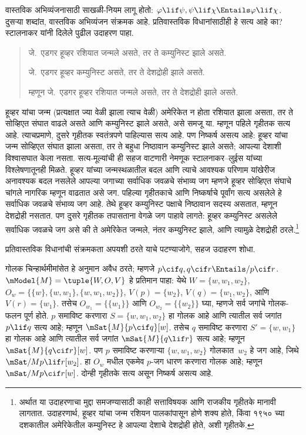 वास्तविक अभिव्यंजनासाठी
साखळी-नियम लागू होतो:
$\varphi \lif \psi, \psi
\lif \chi \Entails \varphi \lif \chi$.
दुसऱ्या शब्दांत,
वास्तविक अभिव्यंजन
संक्रमक आहे.
प्रतिवास्तविक विधानांसाठीही
हे सत्य आहे का?
स्टालनाकर यांनी दिलेले
पुढील उदाहरण पाहा.
\begin{quote}
  जे.~एडगर हूव्हर रशियात
  जन्मले असते, तर ते
  कम्युनिस्ट झाले असते.

  जे.~एडगर हूव्हर कम्युनिस्ट
  असते, तर ते देशद्रोही
  झाले असते.

  म्हणून जे.~एडगर हूव्हर
  रशियात जन्मले असते,
  तर ते देशद्रोही
  झाले असते.
\end{quote}
हूव्हर यांचा जन्म
(प्रत्यक्षात ज्या वेळी झाला
त्याच वेळी) अमेरिकेत
न होता रशियात झाला
असता, तर ते
सोव्हिएत संघात वाढले
असते आणि कम्युनिस्ट
झाले असते, असे
समजू या. म्हणून
पहिले गृहीतक सत्य
आहे. त्याचप्रमाणे,
दुसरे गृहीतक
स्वतंत्रपणे पाहिल्यास
सत्य आहे. पण
निष्कर्ष असत्य आहे:
हूव्हर यांचा जन्म
सोव्हिएत संघात
झाला असता, तर
ते बहुधा निष्ठावान
कम्युनिस्ट झाले
असते; आपल्या
देशाशी विश्वासघात
केला नसता.
सत्य-मूल्यांची ही
सहज वाटणारी
नेमणूक स्टालनाकर--लुईस
यांच्या विश्लेषणातूनही
मिळते. हूव्हर यांच्या
जन्मस्थळातील बदल आणि त्याचे आवश्यक परिणाम
यांखेरीज अनावश्यक बदल नसलेले आपल्या जगाच्या
सर्वाधिक जवळचे
संभाव्य जग म्हणजे
हूव्हर सोव्हिएत
संघाचे चांगले नागरिक
म्हणून वाढतात
असे जग. पहिल्या
गृहीतकाचे आणि
निष्कर्षाचे पूर्वांग
सत्य असलेले हे
सर्वाधिक जवळचे
संभाव्य जग आहे.
तेथे हूव्हर
कम्युनिस्ट पक्षाचे
निष्ठावान सदस्य
असतात, म्हणून
देशद्रोही नसतात.
पण दुसरे गृहीतक
तपासताना वेगळे
जग पाहावे लागते:
हूव्हर कम्युनिस्ट
असलेले सर्वाधिक
जवळचे जग असे
की ते अमेरिकेत
जन्मले, नंतर
कम्युनिस्ट झाले,
आणि त्यामुळे
देशद्रोही ठरले.\footnote{
  अर्थात या उदाहरणाचा
  मुद्दा समजण्यासाठी
  काही सत्ताविषयक
  आणि राजकीय
  गृहीतके मानावी
  लागतात. उदाहरणार्थ,
  हूव्हर यांचा जन्म
  रशियन पालकांपासून
  होणे शक्य होते,
  किंवा १९५० च्या
  दशकातील अमेरिकेतील
  कम्युनिस्ट हे आपल्या
  देशाचे देशद्रोही होते,
  अशी गृहीतके.}

\begin{prob}
  प्रतिवास्तविक विधानांची
  संक्रमकता अपयशी
  ठरते याचे पटण्याजोगे,
  सहज उदाहरण शोधा.
\end{prob}

\begin{ex}\label{cnt:min:tra:ex:trans-counterex}
  गोलक चिन्हार्थमीमांसेत हे
  अनुमान अवैध ठरते;
  म्हणजे
  $p \cif q, q \cif r
  \Entails/ p \cif r$.
  $\mModel{M} = \tuple{W, O, V}$
  हे प्रतिमान पाहा: येथे
  $W = \{w, w_1, w_2\}$,
  $O_w = \{\{w\}, \{w,
  w_1\}, \{w, w_1, w_2\}\}$,
  $V(p) = \{w_2\}$,
  $V(q) = \{w_1, w_2\}$,
  आणि $V(r) = \{w_1\}$.
  तसेच $O_{w_1}=\{\{w_1\}\}$ आणि $O_{w_2}=\{\{w_2\}\}$
  घ्या, म्हणजे सर्व जगांचे गोलक-फलन पूर्ण होते.
  $p$ समाविष्ट करणारा
  $S = \{w, w_1, w_2\}$
  हा गोलक आहे आणि
  त्यातील सर्व जगांत
  $p \lif q$ सत्य आहे;
  म्हणून
  $\mSat{M}{p \cif q}[w]$.
  तसेच $q$ समाविष्ट
  करणारा
  $S' = \{w, w_1\}$
  हा गोलक आहे आणि
  त्यातील सर्व जगांत
  $\mSat{M}{q \lif r}$
  सत्य आहे; म्हणून
  $\mSat{M}{q \cif r}[w]$.
  पण $p$ समाविष्ट
  करणाऱ्या
  $\{w, w_1, w_2\}$
  गोलकात~$w_2$
  हे जग आहे,
  जिथे
  $\mSat/{M}{p \lif
    r}[w_2]$. हा $O_w$ मधील एकमेव $p$-जग धारण करणारा
  गोलक आहे; म्हणून $\mSat/{M}{p\cif r}[w]$.
  दोन्ही गृहीतके सत्य असून निष्कर्ष असत्य आहे.
\end{ex}

